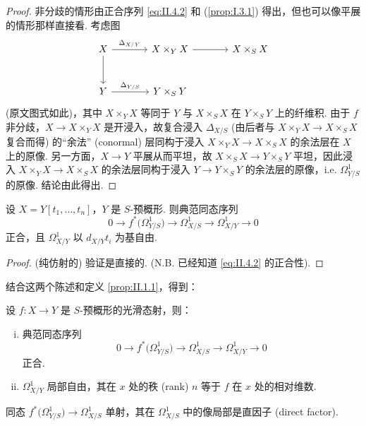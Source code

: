 \begin{proof}
非分歧的情形由正合序列 \eqref{eq:II.4.2} 和 (\ref{prop:I.3.1}) 得出，但也可以像平展的情形那样直接看. 考虑图
\[
\begin{tikzcd}[row sep=large, column sep=large]
X \arrow[r,"\Delta_{X/Y}"] \arrow[d] & X \times_Y X \arrow[r] & X \times_S X \\
Y \arrow[r,"\Delta_{Y/S}"] & Y \times_S Y
\end{tikzcd}
\]
(原文图式如此)，其中 $X \times_Y X$ 等同于 $Y$ 与 $X \times_S X$ 在 $Y \times_S Y$ 上的纤维积. 由于 $f$ 非分歧，$X \to X \times_Y X$ 是开浸入，故复合浸入 $\Delta_{X/S}$ (由后者与 $X \times_Y X \to X \times_S X$ 复合而得) 的``余法'' (conormal) 层同构于浸入 $X \times_Y X \to X \times_S X$ 的余法层在 $X$ 上的原像. 另一方面，$X \to Y$ 平展从而平坦，故 $X \times_S X \to Y \times_S Y$ 平坦，因此浸入 $X \times_Y X \to X \times_S X$ 的余法层同构于浸入 $Y \to Y \times_S Y$ 的余法层的原像，i.e. $\varOmega_{Y/S}^{1}$ 的原像. 结论由此得出.
\end{proof}

\begin{lemma}\label{lem:II.4.2}
设 $X = Y[t_1, \dots, t_n]$，$Y$ 是 $S$-预概形. 则典范同态序列
\[
0 \longrightarrow f^{*}\bigl(\varOmega_{Y/S}^{1}\bigr) \longrightarrow \varOmega_{X/S}^{1} \longrightarrow \varOmega_{X/Y}^{1} \longrightarrow 0
\]
正合，且 $\varOmega_{X/Y}^{1}$ 以 $d_{X/Y} t_i$ 为基自由.
\end{lemma}

\begin{proof}
(纯仿射的) 验证是直接的. (N.B. 已经知道 \eqref{eq:II.4.2} 的正合性).
\end{proof}

结合这两个陈述和定义 \ref{prop:II.1.1}，得到：

\begin{theorem}\label{thm:II.4.3}
设 $f \colon X \to Y$ 是 $S$-预概形的光滑态射，则：
\begin{enumerate}[(i)]
\item 典范同态序列
\[
0 \longrightarrow f^{*}\bigl(\varOmega_{Y/S}^{1}\bigr) \longrightarrow \varOmega_{X/S}^{1} \longrightarrow \varOmega_{X/Y}^{1} \longrightarrow 0
\]
正合.
\item $\varOmega_{X/Y}^{1}$ 局部自由，其在 $x$ 处的秩 (rank) $n$ 等于 $f$ 在 $x$ 处的相对维数.
\end{enumerate}
\end{theorem}

\begin{corollary}\label{cor:II.4.4}
同态 $f^{*}\bigl(\varOmega_{Y/S}^{1}\bigr) \to \varOmega_{X/S}^{1}$ 单射，其在 $\varOmega_{X/S}^{1}$ 中的像局部是直因子 (direct factor).
\end{corollary}

